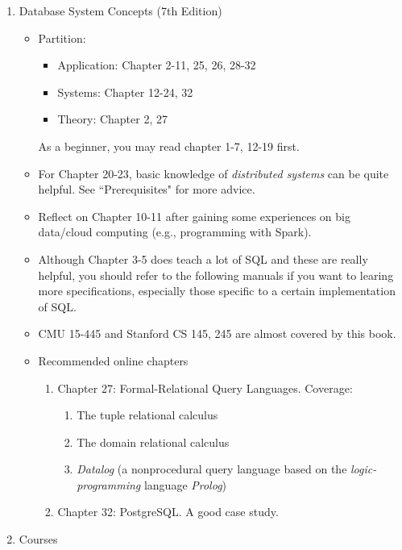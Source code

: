 \documentclass{article}
\begin{document}
\begin{enumerate}
    \item Database System Concepts (7th Edition) \cite{silberschatz2002database}
    \begin{itemize}
        \item Partition:
        \begin{itemize}
            \item Application: Chapter 2-11, 25, 26, 28-32
            \item Systems: Chapter 12-24, 32
            \item Theory: Chapter 2, 27
        \end{itemize}
        As a beginner, you may read chapter 1-7, 12-19 first.        
        \item For Chapter 20-23, basic knowledge of \emph{distributed systems} can be quite helpful.
        See ``Prerequisites" for more advice.
        \item Reflect on Chapter 10-11 after gaining some experiences on big data/cloud computing (e.g., programming with Spark).
        \item Although Chapter 3-5 does teach a lot of SQL and these are really helpful, you should refer to the following manuals if you want to learing more specifications, especially those specific to a certain implementation of SQL.
        \item CMU 15-445 and Stanford CS 145, 245 are almost covered by this book.
        \item Recommended online chapters
        \begin{enumerate}
            \item Chapter 27: Formal-Relational Query Languages.
            Coverage:
            \begin{enumerate}
                \item The tuple relational calculus
                \item The domain relational calculus
                \item \emph{Datalog} (a nonprocedural query language based on the \emph{logic-programming} language \emph{Prolog})
            \end{enumerate}
            \item Chapter 32: PostgreSQL.
            A good case study.
        \end{enumerate}
    \end{itemize}
    \item Courses
    \begin{enumerate}

\end{enumerate}
\end{enumerate}
\end{document}
